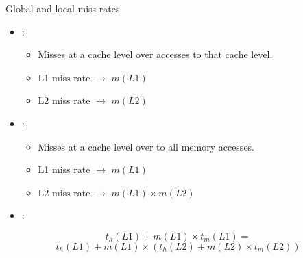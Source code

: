 \begin{frame}[t]{Global and local miss rates}
\begin{itemize}
  \item {}:
    \begin{itemize}
      \item Misses at a cache level over accesses to that cache level.
      \item L1 miss rate $\rightarrow$ $m(L1)$
      \item L2 miss rate $\rightarrow$ $m(L2)$
    \end{itemize}

  \item {}:
    \begin{itemize}
      \item Misses at a cache level over to all memory accesses.
      \item L1 miss rate $\rightarrow$ $m(L1)$
      \item L2 miss rate $\rightarrow$ $m(L1) \times m(L2)$
    \end{itemize}

  \item {}:
\end{itemize}
\[
t_h(L1) + m(L1) \times t_m(L1) =
\]
\[
t_h(L1) + m(L1) \times \left( t_h(L2) + m(L2) \times t_m(L2) \right)
\]
\end{frame}

